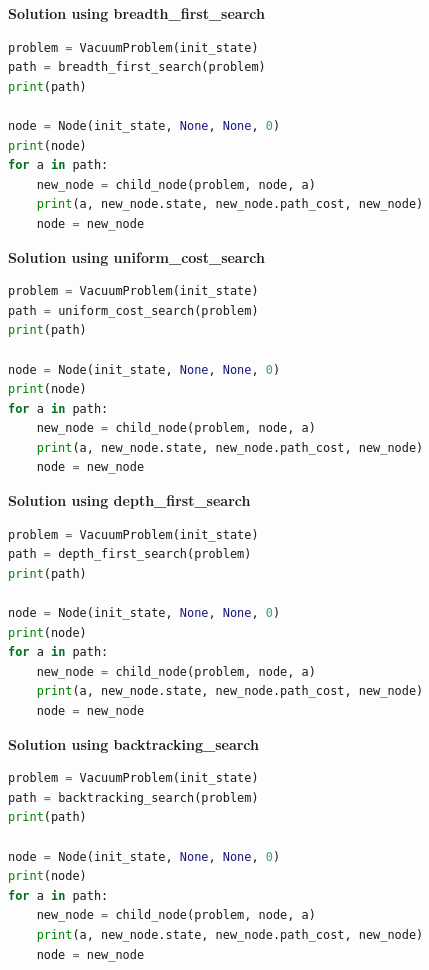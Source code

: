 {\centering \textbf{Solution using breadth\_first\_search} \par}

\begin{lstlisting}[language=Python]
problem = VacuumProblem(init_state)
path = breadth_first_search(problem)
print(path)

node = Node(init_state, None, None, 0)
print(node)
for a in path:
    new_node = child_node(problem, node, a)
    print(a, new_node.state, new_node.path_cost, new_node)
    node = new_node
\end{lstlisting}



{\centering \textbf{Solution using uniform\_cost\_search} \par}

\begin{lstlisting}[language=Python]
problem = VacuumProblem(init_state)
path = uniform_cost_search(problem)
print(path)

node = Node(init_state, None, None, 0)
print(node)
for a in path:
    new_node = child_node(problem, node, a)
    print(a, new_node.state, new_node.path_cost, new_node)
    node = new_node
\end{lstlisting}



{\centering \textbf{Solution using depth\_first\_search} \par}

\begin{lstlisting}[language=Python]
problem = VacuumProblem(init_state)
path = depth_first_search(problem)
print(path)

node = Node(init_state, None, None, 0)
print(node)
for a in path:
    new_node = child_node(problem, node, a)
    print(a, new_node.state, new_node.path_cost, new_node)
    node = new_node
\end{lstlisting}



{\centering \textbf{Solution using backtracking\_search} \par}

\begin{lstlisting}[language=Python]
problem = VacuumProblem(init_state)
path = backtracking_search(problem)
print(path)

node = Node(init_state, None, None, 0)
print(node)
for a in path:
    new_node = child_node(problem, node, a)
    print(a, new_node.state, new_node.path_cost, new_node)
    node = new_node
\end{lstlisting}



